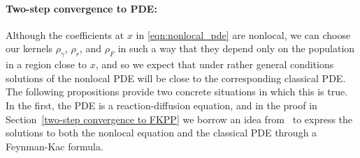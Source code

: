 \documentclass[EJP]{ejpecp} %
\newcommand{\grad}{\nabla}
\newcommand{\DG}{\mathcal{B}}  %
\newcommand{\meanq}{\vec b}    %
\begin{document}

\paragraph{Two-step convergence to PDE:}
Although the coefficients at $x$ in \eqref{eqn:nonlocal_pde} are nonlocal,
we can choose our kernels $\rho_\gamma$, $\rho_r$, and $\rho_F$
in such a way that they depend only on the population in a region close to $x$,
and so we expect that under rather general conditions
solutions of the nonlocal PDE will be close to the corresponding 
classical PDE.
The following propositions provide two concrete situations in which this is true.
In the first, the PDE is a reaction-diffusion equation, and
in the proof in Section~\ref{two-step convergence to FKPP} we borrow
an idea from~\cite{penington:2017} to express the solutions to both the nonlocal
equation and the classical PDE through a Feynman-Kac formula. 
\end{document}
